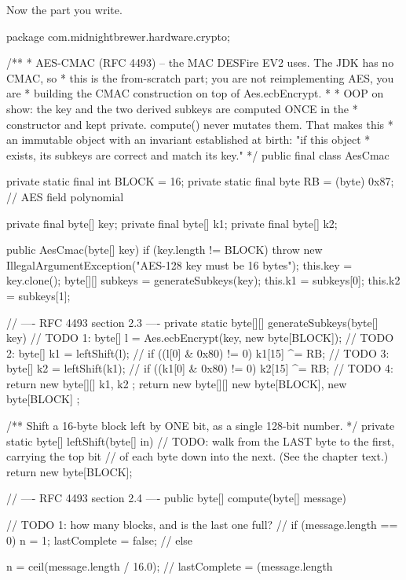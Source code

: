 Now the part you write.

\begin{jcode}
package com.midnightbrewer.hardware.crypto;

/**
 * AES-CMAC (RFC 4493) -- the MAC DESFire EV2 uses. The JDK has no CMAC, so
 * this is the from-scratch part; you are not reimplementing AES, you are
 * building the CMAC construction on top of Aes.ecbEncrypt.
 *
 * OOP on show: the key and the two derived subkeys are computed ONCE in the
 * constructor and kept private. compute() never mutates them. That makes this
 * an immutable object with an invariant established at birth: "if this object
 * exists, its subkeys are correct and match its key."
 */
public final class AesCmac {

    private static final int BLOCK = 16;
    private static final byte RB = (byte) 0x87;  // AES field polynomial

    private final byte[] key;
    private final byte[] k1;
    private final byte[] k2;

    public AesCmac(byte[] key) {
        if (key.length != BLOCK) {
            throw new IllegalArgumentException("AES-128 key must be 16 bytes");
        }
        this.key = key.clone();
        byte[][] subkeys = generateSubkeys(key);
        this.k1 = subkeys[0];
        this.k2 = subkeys[1];
    }

    // ---- RFC 4493 section 2.3 ----
    private static byte[][] generateSubkeys(byte[] key) {
        // TODO 1: byte[] l = Aes.ecbEncrypt(key, new byte[BLOCK]);
        // TODO 2: byte[] k1 = leftShift(l);
        //         if ((l[0] & 0x80) != 0) k1[15] ^= RB;
        // TODO 3: byte[] k2 = leftShift(k1);
        //         if ((k1[0] & 0x80) != 0) k2[15] ^= RB;
        // TODO 4: return new byte[][]{ k1, k2 };
        return new byte[][]{ new byte[BLOCK], new byte[BLOCK] };
    }

    /** Shift a 16-byte block left by ONE bit, as a single 128-bit number. */
    private static byte[] leftShift(byte[] in) {
        // TODO: walk from the LAST byte to the first, carrying the top bit
        //       of each byte down into the next. (See the chapter text.)
        return new byte[BLOCK];
    }

    // ---- RFC 4493 section 2.4 ----
    public byte[] compute(byte[] message) {
        // TODO 1: how many blocks, and is the last one full?
        //   if (message.length == 0) { n = 1; lastComplete = false; }
        //   else { n = ceil(message.length / 16.0);
        //          lastComplete = (message.length %

}}}
\end{jcode}
